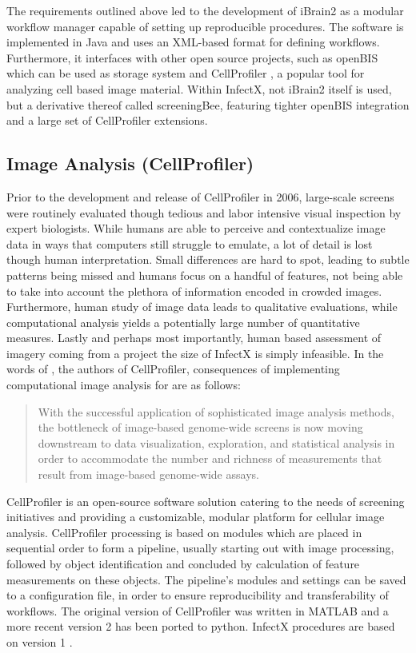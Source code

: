 The requirements outlined above led to the development of iBrain2 as a modular workflow manager capable of setting up reproducible procedures. The software is implemented in Java and uses an XML-based format for defining workflows. Furthermore, it interfaces with other open source projects, such as openBIS \citep{Bauch2011} which can be used as storage system and CellProfiler \citep{Carpenter2006,Kamentsky2011}, a popular tool for analyzing cell based image material. Within InfectX, not iBrain2 itself is used, but a derivative thereof called screeningBee, featuring tighter openBIS integration and a large set of CellProfiler extensions.

\subsection{Image Analysis (CellProfiler)}
Prior to the development and release of CellProfiler in 2006, large-scale screens were routinely evaluated though tedious and labor intensive visual inspection by expert biologists. While humans are able to perceive and contextualize image data in ways that computers still struggle to emulate, a lot of detail is lost though human interpretation. Small differences are hard to spot, leading to subtle patterns being missed and humans focus on a handful of features, not being able to take into account the plethora of information encoded in crowded images. Furthermore, human study of image data leads to qualitative evaluations, while computational analysis yields a potentially large number of quantitative measures. Lastly and perhaps most importantly, human based assessment of imagery coming from a project the size of InfectX is simply infeasible. In the words of \citeauthor{Carpenter2006}, the authors of CellProfiler, consequences of implementing computational image analysis for  are as follows:

\begin{quote}
With the successful application of sophisticated image analysis methods, the bottleneck of image-based genome-wide screens is now moving downstream to data visualization, exploration, and statistical analysis in order to accommodate the number and richness of measurements that result from image-based genome-wide assays.
\end{quote}

CellProfiler is an open-source software solution catering to the needs of  screening initiatives and providing a customizable, modular platform for cellular image analysis. CellProfiler processing is based on modules which are placed in sequential order to form a pipeline, usually starting out with image processing, followed by object identification and concluded by calculation of feature measurements on these objects. The pipeline's modules and settings can be saved to a configuration file, in order to ensure reproducibility and transferability of workflows. The original version of CellProfiler was written in MATLAB and a more recent version 2 has been ported to python. InfectX procedures are based on version 1 \citep{Carpenter2006}.

